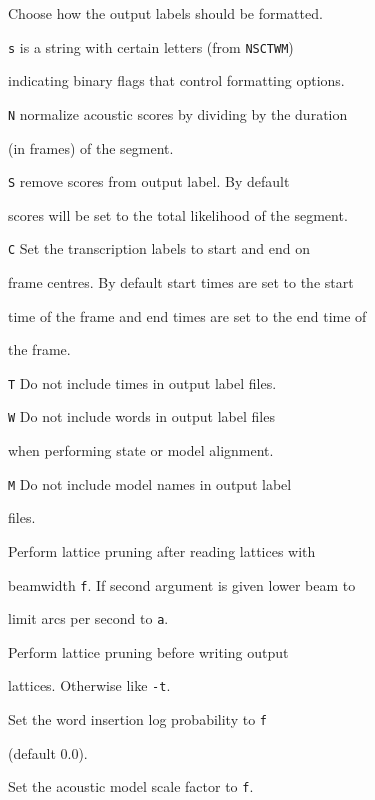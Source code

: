 \begin{optlist}
   Choose how the output labels should be formatted.


        \texttt{s} is a string with certain letters (from \texttt{NSCTWM})


        indicating binary flags that control formatting options.


        \texttt{N} normalize acoustic scores by dividing by the duration


        (in frames) of the segment.


        \texttt{S} remove scores from output label.  By default 


        scores will be set to the total likelihood of the segment.


        \texttt{C} Set the transcription labels to start and end on


        frame centres. By default start times are set to the start


        time of the frame and end times are set to the end time of 


        the frame.


        \texttt{T} Do not include times in output label files.


        \texttt{W} Do not include words in output label files


        when performing state or model alignment.


        \texttt{M} Do not include model names in output label


        files.





   Perform lattice pruning after reading lattices with


  beamwidth \texttt{f}. If second argument is given lower beam to


  limit arcs per second to \texttt{a}.





   Perform lattice pruning before writing output


  lattices. Otherwise like \texttt{-t}.





   Set the word insertion log probability to \texttt{f} 


  (default 0.0).


  


   Set the acoustic model scale factor to \texttt{f}.



\end{optlist}
